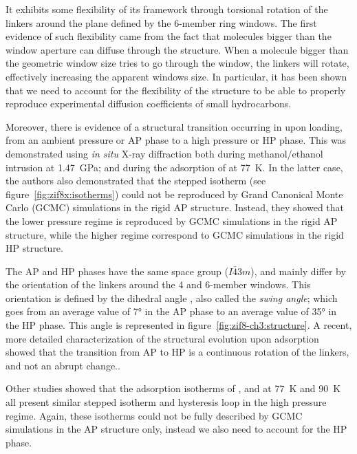 \documentclass[thesis]{subfiles}
\begin{document}
It exhibits some flexibility of its framework through torsional rotation of the
linkers around the plane defined by the 6-member ring windows. The first
evidence of such flexibility came from the fact that molecules bigger than the
window aperture can diffuse through the structure. When a molecule bigger than
the geometric window size tries to go through the window, the linkers will
rotate, effectively increasing the apparent windows size. In particular, it has
been shown that we need to account for the flexibility of the structure to be
able to properly reproduce experimental diffusion coefficients of small
hydrocarbons\cite{Verploegh2015}.

Moreover, there is evidence of a structural transition occurring in  upon
loading, from an ambient pressure or AP phase to a high pressure or HP phase.
This was demonstrated using \emph{in situ} X-ray diffraction both during
methanol/ethanol intrusion at \SI{1,47}{GPa}\cite{Moggach2009}; and during the
adsorption of  at \SI{77}{K}\cite{FairenJimenez2011}. In the latter case,
the authors also demonstrated that the stepped isotherm (see
figure~\ref{fig:zif8x:isotherms}) could not be reproduced by Grand Canonical
Monte Carlo (GCMC) simulations in the rigid AP structure. Instead, they showed
that the lower pressure regime is reproduced by GCMC simulations in the rigid AP
structure, while the higher regime correspond to GCMC simulations in the rigid
HP structure.

The AP and HP phases have the same space group ($I\bar{4}3m$), and mainly differ
by the orientation of the linkers around the 4 and 6-member windows. This
orientation is defined by the dihedral angle , also called the
\emph{swing angle}; which goes from an average value of 7° in the AP phase to an
average value of 35° in the HP phase.\cite{FairenJimenez2011} This angle is
represented in figure~\ref{fig:zif8-ch3:structure}. A recent, more detailed
characterization of the structural evolution upon adsorption showed that the
transition from AP to HP is a continuous rotation of the linkers, and not an
abrupt change.\cite{Coudert2017}.

Other studies\cite{FairenJimenez2012, Ania2012} showed that the adsorption
isotherms of ,  and  at \SI{77}{K} and \SI{90}{K} all
present similar stepped isotherm and hysteresis loop in the high pressure
regime. Again, these isotherms could not be fully described by GCMC simulations
in the AP structure only, instead we also need to account for the HP phase.
\end{document}

